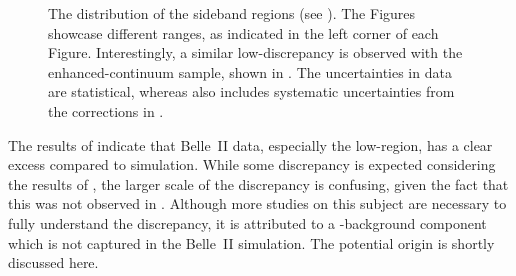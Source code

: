 \begin{figure}[htbp!]
    \centering
    \caption{\label{fig:sidebands_mbc} 
    The \Mbc distribution of the \EB sideband regions (see ).
    The Figures showcase different \EB ranges, as indicated in the left corner of each Figure.
    Interestingly, a similar low-\Mbc discrepancy is observed with the enhanced-continuum sample, shown in .
    The uncertainties in data are statistical, whereas \MC also includes systematic uncertainties from the corrections in .
    }
\end{figure}

The results of  indicate that Belle~II data, especially the low-\Mbc region, has a clear excess compared to simulation.
While some discrepancy is expected considering the results of ,
the larger scale of the discrepancy is confusing, given the fact that this was not observed in .
Although more studies on this subject are necessary to fully understand the discrepancy, 
it is attributed to a \BB-background component which is not captured in the Belle~II simulation. 
The potential origin is shortly discussed here.

